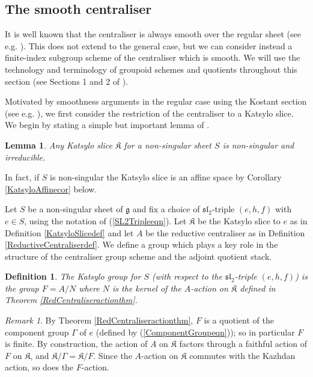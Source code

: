\documentclass{amsart}
\newtheorem{lemma}[theorem]{Lemma}
\newtheorem{definition}[theorem]{Definition}
\theoremstyle{remark}
\newtheorem{remark}[theorem]{Remark}
\numberwithin{theorem}{section}
\numberwithin{equation}{section}
\begin{document}
\subsection{The smooth centraliser}\label{SmoothCentralisersbn}
It is well known that the centraliser is always smooth over the regular sheet (see e.g. \cite{DG}). This does not extend to the general case, but we can consider instead a finite-index subgroup scheme of the centraliser which is smooth. We will use the technology and terminology of groupoid schemes and quotients throughout this section (see Sections 1 and 2 of \cite{KM}).

Motivated by smoothness arguments in the regular case using the Kostant section (see e.g. \cite[Section 3.3]{Riche}), we first consider the restriction of the centraliser to a Katsylo slice. We begin by stating a simple but important lemma of \cite{PT}.

\begin{lemma}\cite[Remark 6(b)]{PT}\label{KatsyloSmoothlem}
    Any Katsylo slice $\mathfrak{K}$ for a non-singular sheet $S$ is non-singular and irreducible.
\end{lemma}

In fact, if $S$ is non-singular the Katsylo slice is an affine space by Corollary \ref{KatsyloAffinecor} below.

Let $S$ be a non-singular sheet of $\mathfrak{g}$ and fix a choice of $\mathfrak{sl}_2$-triple $(e,h,f)$ with $e \in S$, using the notation of (\ref{SL2Tripleeqn}). Let $\mathfrak{K}$ be the Katsylo slice to $e$ as in Definition \ref{KatsyloSlicedef} and let $A$ be the reductive centraliser as in Definition \ref{ReductiveCentraliserdef}. We define a group which plays a key role in the structure of the centraliser group scheme and the adjoint quotient stack.

\begin{definition}\label{KatsyloGpdef}
    The \emph{Katsylo group} for $S$ (with respect to the $\mathfrak{sl}_2$-triple $(e,h,f)$) is the group $F=A/N$ where $N$ is the kernel of the $A$-action on $\mathfrak{K}$ defined in Theorem \ref{RedCentraliseractionthm}.
\end{definition}

\begin{remark}\label{KatsyloGprmk}
    By Theorem \ref{RedCentraliseractionthm}, $F$ is a quotient of the component group $\Gamma$ of $e$ (defined by  (\ref{ComponentGroupeqn})); so in particular $F$ is finite. By construction, the action of $A$ on $\mathfrak{K}$ factors through a faithful action of $F$ on $\mathfrak{K}$, and $\mathfrak{K}/\Gamma = \mathfrak{K}/F$. Since the $A$-action on $\mathfrak{K}$ commutes with the Kazhdan action, so does the $F$-action.
\end{remark}
\end{document}
